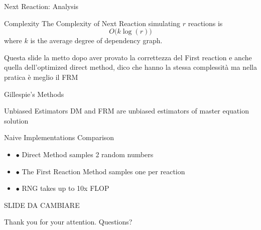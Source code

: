 \documentclass{beamer}
\begin{document}
\begin{frame}{Next Reaction: Analysis}
  \begin{block}{Complexity}
    The Complexity of Next Reaction simulating $r$ reactions is
    $$ O\bigl(k \log(r)\bigr) $$
    where $k$ is the average degree of dependency graph.    
  \end{block}
  Questa slide la metto dopo aver provato la correttezza del First reaction e anche quella
  dell'optimized direct method, dico che hanno la stessa complessità ma nella pratica è meglio il FRM
\end{frame}

\begin{frame}{Gillespie's Methods}
  \begin{block}{Unbiased Estimators}
    DM and FRM are unbiased estimators of
    master equation solution

  \end{block}
  \begin{block}{Naive Implementations Comparison}
    \begin{itemize} 
    \item $\bullet$ Direct Method samples 2 random numbers
    \item $\bullet$ The First Reaction Method samples one per reaction 
    \item $\bullet$ RNG takes up to 10x FLOP
    \end{itemize}
  \end{block}
\center \Huge{SLIDE DA CAMBIARE}
\end{frame}

\begin{frame}
  \begin{center}
    \Huge{Thank you for your attention.}
    \Huge{Questions?}
  \end{center}
\end{frame}
\end{document}
